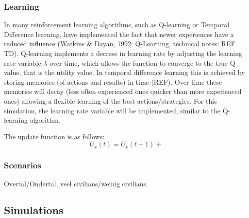 \subsubsection{Learning}
In many re\"inforcement learning algorithms, such as Q-learning or Temporal Difference learning, have implemented the fact that newer experiences have a reduced influence  (Watkins \& Dayan, 1992: Q-Learning, technical notes; REF TD). Q-learning implements a decrese in learning rate by adjusting the learning rate variable $\lambda$ over time, which allows the function to converge to the true Q-value, that is the utility value. In temporal difference learning this is achieved by storing memories (of actions and results) in time (REF). Over time these memories will decay (less often experienced ones quicker than more experienced ones) allowing a flexible learning of the best actions/strategies. For this simulation, the learning rate variable will be implemented, similar to the Q-learning algorithm. 

The update function is as follows:
$$ U_x(t) = U_x(t-1) + $$


\subsubsection{Scenarios}
Overtal/Ondertal, veel civilians/weinig civilians. 

\subsection{Simulations}
